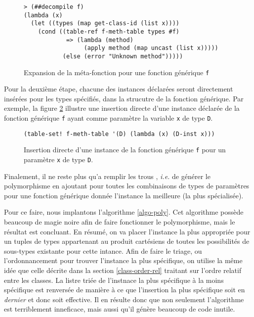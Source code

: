      \begin{figure}[h!]
        \begin{lstlisting}
> (##decompile f)
(lambda (x)
  (let ((types (map get-class-id (list x))))
    (cond ((table-ref f-meth-table types #f)
            => (lambda (method) 
                 (apply method (map uncast (list x)))))
           (else (error "Unknown method")))))
        \end{lstlisting}
        \caption{Expansion de la méta-fonction pour une fonction
          générique \texttt{f}}
        \label{meta-genfun}
      \end{figure}
      
      Pour la deuxième étape, chacune des instances déclarées seront
      directement insérées pour les types spécifiés, dans la strucutre
      de la fonction générique. Par exemple, la figure
      \ref{ex-insertion-directe-meth} illustre une insertion directe
      d'une instance déclarée de la fonction générique \texttt{f}
      ayant comme paramètre la variable \texttt{x} de type \texttt{D}.

      \begin{figure}[h!]
        \begin{lstlisting}
(table-set! f-meth-table '(D) (lambda (x) (D-inst x)))
        \end{lstlisting}
        \caption{Insertion directe d'une instance de la fonction
          générique \texttt{f} pour un paramètre \texttt{x} de type
          \texttt{D}.}
        \label{ex-insertion-directe-meth}
      \end{figure}

      Finalement, il ne reste plus qu'a \og remplir les trous \fg,
      \textit{i.e.} de générer le polymorphisme en ajoutant pour
      toutes les combinaisons de types de paramètres pour une fonction
      générique donnée l'instance la meilleure (la plus spécialisée).

      Pour ce faire, nous implantons l'algorithme \ref{algo-poly}. Cet
      algorithme possède beaucoup de \og magie noire \fg afin de faire
      fonctionner le polymorphisme, mais le résultat est concluant. En
      résumé, on va placer l'instance la plus appropriée pour un
      tuples de types appartenant au produit cartésiens de toutes les
      possibilités de sous-types existante pour cette intance. Afin de
      faire le triage, ou l'ordonnancement pour trouver l'instance la
      plus spécifique, on utilise la même idée que celle décrite dans
      la section \ref{class-order-rel} traitant sur l'ordre relatif
      entre les classes. La listre triée de l'instnace la plus
      spécifique à la moins spécifique est renversée de manière à ce
      que l'insertion la plus spécifique soit en \emph{dernier} et
      donc soit effective. Il en résulte donc que non seulement
      l'algorithme est terriblement inneficace, mais aussi qu'il
      génère beaucoup de code inutile.

